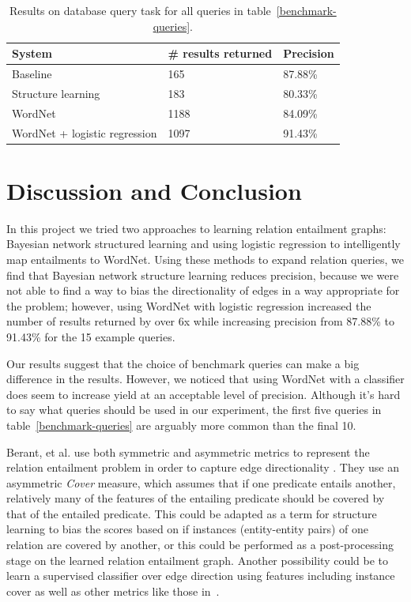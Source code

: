 \documentclass{article}
\begin{document}
\begin{table}[h]
  \caption{Results on database query task for all queries in table~\ref{benchmark-queries}.}\label{combined-results}
  \begin{center}
    \begin{tabular}{l l l}
      \toprule
      System & \# results returned & Precision\\
      \midrule
      Baseline & 165 & 87.88\%\\
      Structure learning & 183 & 80.33\%\\
      WordNet & 1188 & 84.09\% \\
      WordNet + logistic regression & 1097 & 91.43\%\\
      \bottomrule
    \end{tabular}
  \end{center}
\end{table}

\section{Discussion and Conclusion}

In this project we tried two approaches to learning relation entailment graphs: Bayesian network structured learning and using logistic regression to intelligently map entailments to WordNet. Using these methods to expand relation queries, we find that Bayesian network structure learning reduces precision, because we were not able to find a way to bias the directionality of edges in a way appropriate for the problem; however, using WordNet with logistic regression increased the number of results returned by over 6x while increasing precision from 87.88\% to 91.43\% for the 15 example queries.

Our results suggest that the choice of benchmark queries can make a big difference in the results. However, we noticed that using WordNet with a classifier does seem to increase yield at an acceptable level of precision. Although it's hard to say what queries should be used in our experiment, the first five queries in table~\ref{benchmark-queries} are arguably more common than the final 10.

Berant, et al. use both symmetric and asymmetric metrics to represent the relation entailment problem in order to capture edge directionality \cite{Berant:2012:LER:2122944.2122947}. They use an asymmetric \textit{Cover} measure, which assumes that if one predicate entails another, relatively many of the features of the entailing predicate should be covered by that of the entailed predicate. This could be adapted as a term for structure learning to bias the scores based on if instances (entity-entity pairs) of one relation are covered by another, or this could be performed as a post-processing stage on the learned relation entailment graph. Another possibility could be to learn a supervised classifier over edge direction using features including instance cover as well as other metrics like those in~\cite{Berant:2012:LER:2122944.2122947}.
\end{document}
